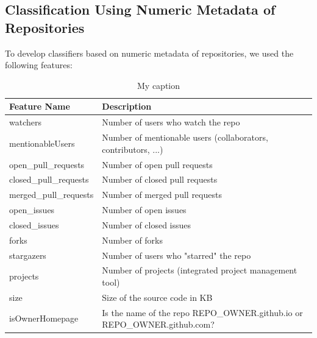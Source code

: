 \documentclass{article}
\begin{document}
\subsection{Classification Using Numeric Metadata of
Repositories}\label{classification-using-numeric-metadata-of-repositories}

To develop classifiers based on numeric metadata of repositories, we
used the following features:

\begin{table}[]
\centering
\caption{My caption}
\label{my-label}
\begin{tabularx}{\linewidth}{|l|X|}
\hline
Feature Name           & Description                                                                        \\ \hline
watchers               & Number of users who watch the repo                                                 \\ \hline
mentionableUsers       & Number of mentionable users (collaborators, contributors, ...)                     \\ \hline
open\_pull\_requests   & Number of open pull requests                                                       \\ \hline
closed\_pull\_requests & Number of closed pull requests                                                     \\ \hline
merged\_pull\_requests & Number of merged pull requests                                                     \\ \hline
open\_issues           & Number of open issues                                                              \\ \hline
closed\_issues         & Number of closed issues                                                            \\ \hline
forks                  & Number of forks                                                                    \\ \hline
stargazers             & Number of users who "starred" the repo                                             \\ \hline
projects               & Number of projects (integrated project management tool)                            \\ \hline
size                   & Size of the source code in KB                                                      \\ \hline
isOwnerHomepage        & Is the name of the repo REPO\_OWNER.github.io or REPO\_OWNER.github.com?         \\ \hline

\end{tabularx}
\end{table}
\end{document}
